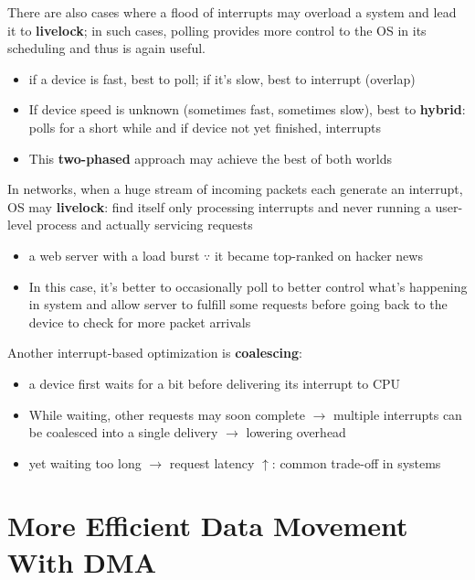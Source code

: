\documentclass[8pt,a4paper,landscape]{extarticle}
\begin{document}
\begin{multicols*}{3}
\begin{tcolorbox}[left=0mm, top=1mm, right=0mm, rightlower=0mm, bottom=1mm,
  title= Interrupts \mr{NOT always} better than polling,
  halign title=center]
  There are also cases where a flood of interrupts may overload a system and lead it to \textbf{livelock}; in such cases, polling provides more control to the OS in its scheduling and thus is again useful.
\end{tcolorbox}
\begin{itemize}
\item if a device is fast, best to poll; if it's slow, best to interrupt (overlap)
\item If device speed is unknown (sometimes fast, sometimes slow), best to \textbf{hybrid}: polls for a short while and if device not yet finished, interrupts
\item This \textbf{two-phased} approach may achieve the best of both worlds
\end{itemize}
In networks, when a huge stream of incoming packets each generate an interrupt, OS may \textbf{livelock}: find itself only processing interrupts and never running a user-level process and actually servicing requests
\begin{itemize}
\item a web server with a load burst $\because$ it became top-ranked on hacker news
\item In this case, it's better to occasionally poll to better control what's happening in system and allow server to fulfill some requests before going back to the device to check for more packet arrivals
\end{itemize}
Another interrupt-based optimization is \textbf{coalescing}:
\begin{itemize}
\item a device first waits for a bit before delivering its interrupt to CPU
\item While waiting, other requests may soon complete $\to$ multiple interrupts can be coalesced into a single delivery $\to$ lowering overhead
\item yet waiting too long $\to$ request latency $\uparrow$: common trade-off in systems
\end{itemize}
\section*{More Efficient Data Movement With DMA}
\end{multicols*}
\end{document}

